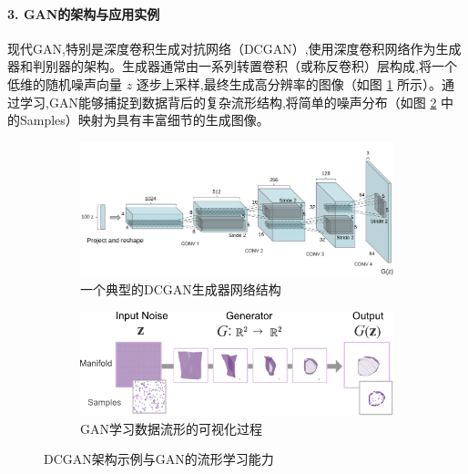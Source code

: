 \begin{itemize}
    \paragraph{3. GAN的架构与应用实例}
    现代GAN,特别是深度卷积生成对抗网络（DCGAN）,使用深度卷积网络作为生成器和判别器的架构。生成器通常由一系列转置卷积（或称反卷积）层构成,将一个低维的随机噪声向量 $z$ 逐步上采样,最终生成高分辨率的图像（如图 \ref{fig:dcgan_generator_arch} 所示）。通过学习,GAN能够捕捉到数据背后的复杂流形结构,将简单的噪声分布（如图 \ref{fig:gan_manifold_learning} 中的Samples）映射为具有丰富细节的生成图像。

    \begin{figure}[htbp]
        \centering
        \begin{subfigure}[b]{0.48\textwidth}
            \centering
            \includegraphics[width=\textwidth]{figures/GAN7.png}
            \caption{一个典型的DCGAN生成器网络结构}
            \label{fig:dcgan_generator_arch}
        \end{subfigure}
        \hfill
        \begin{subfigure}[b]{0.48\textwidth}
            \centering
            \includegraphics[width=\textwidth]{figures/GAN8.png}
            \caption{GAN学习数据流形的可视化过程}
            \label{fig:gan_manifold_learning}
        \end{subfigure}
        \caption{DCGAN架构示例与GAN的流形学习能力}
        \label{fig:gan_arch_and_manifold}
    \end{figure}


\end{itemize}
